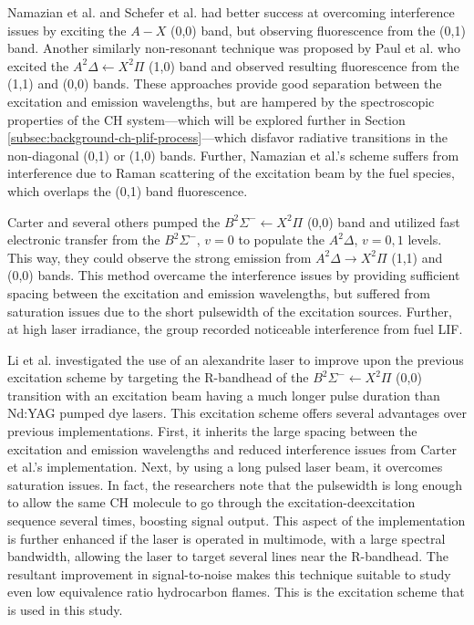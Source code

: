 Namazian et al.\cite{1986-namazian} and Schefer et al.\cite{1994-schefer} had better success at overcoming interference issues by exciting the \(A-X\) (0,0) band, but observing fluorescence from the (0,1) band.
Another similarly non-resonant technique was proposed by Paul et al.\cite{1994-paul} who excited the \(A^2\Delta\leftarrow X^2\Pi\) (1,0) band and observed resulting fluorescence from the (1,1) and (0,0) bands.
These approaches provide good separation between the excitation and emission wavelengths, but are hampered by the spectroscopic properties of the CH system---which will be explored further in Section \ref{subsec:background-ch-plif-process}---which disfavor radiative transitions in the non-diagonal (0,1) or (1,0) bands.
Further, Namazian et al.'s scheme suffers from interference due to Raman scattering of the excitation beam by the fuel species, which overlaps the (0,1) band fluorescence.

Carter and several others\cite{1998-carter,1999-watson,2000-watson,2000-donbar,2000-han,2002-kothnur,2003-han-a,2003-han-b,2003-sutton} pumped the \(B^2\Sigma^-\leftarrow X^2\Pi\) (0,0) band and utilized fast electronic transfer from the \(B^2\Sigma^-\), \(v=0\) to populate the \(A^2\Delta\), \(v=0,1\) levels.
This way, they could observe the strong emission from \(A^2\Delta\rightarrow X^2\Pi\) (1,1) and (0,0) bands.
This method overcame the interference issues by providing sufficient spacing between the excitation and emission wavelengths, but suffered from saturation issues due to the short pulsewidth of the excitation sources.
Further, at high laser irradiance, the group recorded noticeable interference from fuel LIF.

Li et al.\cite{2007-li-a,2007-li-b,2007-kiefer} investigated the use of an alexandrite laser\cite{2004-li} to improve upon the previous excitation scheme by targeting the R-bandhead of the \(B^2\Sigma^-\leftarrow X^2\Pi\) (0,0) transition with an excitation beam having a much longer pulse duration than Nd:YAG pumped dye lasers.
This excitation scheme offers several advantages over previous implementations.
First, it inherits the large spacing between the excitation and emission wavelengths and reduced interference issues from Carter et al.'s implementation.
Next, by using a long pulsed laser beam, it overcomes saturation issues.
In fact, the researchers note that the pulsewidth is long enough to allow the same CH molecule to go through the excitation-deexcitation sequence several times, boosting signal output.
This aspect of the implementation is further enhanced if the laser is operated in multimode, with a large spectral bandwidth, allowing the laser to target several lines near the R-bandhead.
The resultant improvement in signal-to-noise makes this technique suitable to study even low equivalence ratio hydrocarbon flames.
This is the excitation scheme that is used in this study.

